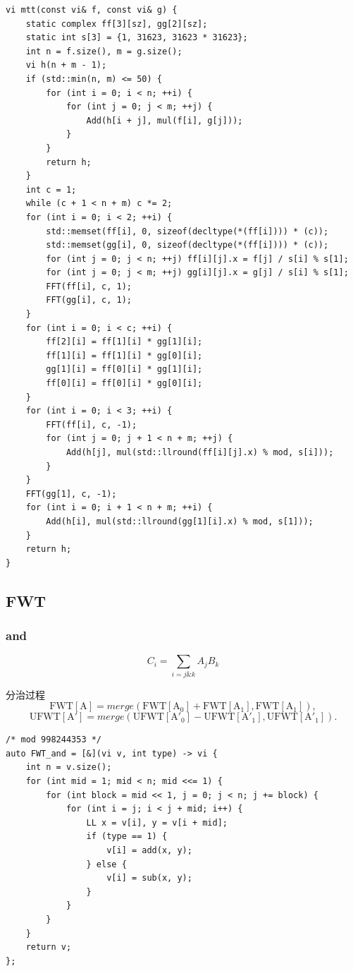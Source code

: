 \documentclass[UTF8, a4paper, titlepage, twoside]{ctexart}
\begin{document}
\begin{lstlisting}[style=cpp]
vi mtt(const vi& f, const vi& g) {
    static complex ff[3][sz], gg[2][sz];
    static int s[3] = {1, 31623, 31623 * 31623};
    int n = f.size(), m = g.size();
    vi h(n + m - 1);
    if (std::min(n, m) <= 50) {
        for (int i = 0; i < n; ++i) {
            for (int j = 0; j < m; ++j) {
                Add(h[i + j], mul(f[i], g[j]));
            }
        }
        return h;
    }
    int c = 1;
    while (c + 1 < n + m) c *= 2;
    for (int i = 0; i < 2; ++i) {
        std::memset(ff[i], 0, sizeof(decltype(*(ff[i]))) * (c));
        std::memset(gg[i], 0, sizeof(decltype(*(ff[i]))) * (c));
        for (int j = 0; j < n; ++j) ff[i][j].x = f[j] / s[i] % s[1];
        for (int j = 0; j < m; ++j) gg[i][j].x = g[j] / s[i] % s[1];
        FFT(ff[i], c, 1);
        FFT(gg[i], c, 1);
    }
    for (int i = 0; i < c; ++i) {
        ff[2][i] = ff[1][i] * gg[1][i];
        ff[1][i] = ff[1][i] * gg[0][i];
        gg[1][i] = ff[0][i] * gg[1][i];
        ff[0][i] = ff[0][i] * gg[0][i];
    }
    for (int i = 0; i < 3; ++i) {
        FFT(ff[i], c, -1);
        for (int j = 0; j + 1 < n + m; ++j) {
            Add(h[j], mul(std::llround(ff[i][j].x) % mod, s[i]));
        }
    }
    FFT(gg[1], c, -1);
    for (int i = 0; i + 1 < n + m; ++i) {
        Add(h[i], mul(std::llround(gg[1][i].x) % mod, s[1]));
    }
    return h;
}
\end{lstlisting}

\subsection{ FWT }
\subsubsection*{ and }
\[
C_i = \sum\limits_{i = j \& k} A_j B_k
\]

分治过程
\[
\operatorname{FWT[A]} = merge(\operatorname{FWT[A_0]} + \operatorname{FWT[A_1]}, \operatorname{FWT[A_1]}),
\]
\[
\operatorname{UFWT[A']} = merge(\operatorname{UFWT[A'_0]} - \operatorname{UFWT[A'_1]}, \operatorname{UFWT[A'_1]}).
\]

\begin{lstlisting}[style=cpp]
/* mod 998244353 */
auto FWT_and = [&](vi v, int type) -> vi {
    int n = v.size();
    for (int mid = 1; mid < n; mid <<= 1) {
        for (int block = mid << 1, j = 0; j < n; j += block) {
            for (int i = j; i < j + mid; i++) {
                LL x = v[i], y = v[i + mid];
                if (type == 1) {
                    v[i] = add(x, y);
                } else {
                    v[i] = sub(x, y);
                }
            }
        }
    }
    return v;
};
\end{lstlisting}
\end{document}
